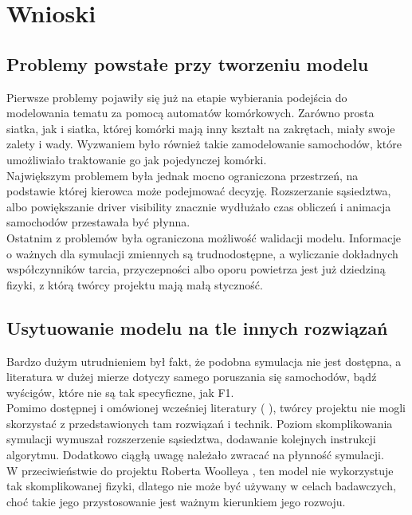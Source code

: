 \documentclass{article}
\begin{document}
\section{Wnioski}
\subsection{Problemy powstałe przy tworzeniu modelu}
Pierwsze problemy pojawiły się już na etapie wybierania podejścia do modelowania tematu za pomocą automatów komórkowych. Zarówno prosta siatka, jak i siatka, której komórki mają inny kształt na zakrętach, miały swoje zalety i wady. Wyzwaniem było również takie zamodelowanie samochodów, które umożliwiało traktowanie go jak pojedynczej komórki. \\

Największym problemem była jednak mocno ograniczona przestrzeń, na podstawie której kierowca może podejmować decyzję. Rozszerzanie sąsiedztwa, albo powiększanie driver visibility znacznie wydłużało czas obliczeń i animacja samochodów przestawała być płynna. \\

Ostatnim z problemów była ograniczona możliwość walidacji modelu. Informacje o ważnych dla symulacji zmiennych są trudnodostępne, a wyliczanie dokładnych współczynników tarcia, przyczepności albo oporu powietrza jest już dziedziną fizyki, z którą twórcy projektu mają małą styczność. 

\subsection{Usytuowanie modelu na tle innych rozwiązań}
Bardzo dużym utrudnieniem był fakt, że podobna symulacja nie jest dostępna, a literatura w dużej mierze dotyczy samego poruszania się samochodów, bądź wyścigów, które nie są tak specyficzne, jak F1. \\

Pomimo dostępnej i omówionej wcześniej literatury (\cite{gca} \cite{race} \cite{was}), twórcy projektu nie mogli skorzystać z przedstawionych tam rozwiązań i technik. Poziom skomplikowania symulacji wymuszał rozszerzenie sąsiedztwa, dodawanie kolejnych instrukcji algorytmu. Dodatkowo ciągłą uwagę należało zwracać na płynność symulacji. \\

W przeciwieństwie do projektu Roberta Woolleya \cite{woolley}, ten model nie wykorzystuje tak skomplikowanej fizyki, dlatego nie może być używany w celach badawczych, choć takie jego przystosowanie jest ważnym kierunkiem jego rozwoju.
\end{document}
